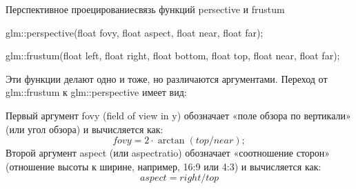 \documentclass{beamer}
\begin{document}
	\begin{frame}{Перспективное проецирование}{связь функций persective и frustum}

		
		glm::perspective(float fovy, float aspect, float near, float far);
		
		glm::frustum(float left, float right, float bottom, float top, float near, float far);
		
		Эти функции делают одно и тоже, но различаются аргументами.
		Переход от glm::frustum к glm::perspective имеет вид:

		Первый аргумент fovy  (field of view in y) обозначает «поле обзора по вертикали» (или угол обзора) и вычисляется как:
		\[
			fovy = 2 \cdot \arctan (top / near);
		\]
		Второй аргумент aspect (или aspectratio) обозначает «соотношение сторон» (отношение высоты к ширине, например, 16:9 или 4:3) и вычисляется как:
		\[
			aspect =  right / top
		\]
		

	\end{frame}
\end{document}
